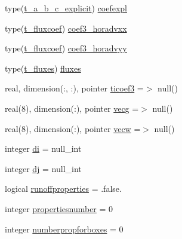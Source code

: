 \begin{DoxyCompactItemize}
\item 
type(\mbox{\hyperlink{structmodulerunoffproperties_1_1t__a__b__c__explicit}{t\+\_\+a\+\_\+b\+\_\+c\+\_\+explicit}}) \mbox{\hyperlink{structmodulerunoffproperties_1_1t__runoffproperties_a3c224ba894eb33b19bbb05306503ec32}{coefexpl}}
\item 
type(\mbox{\hyperlink{structmodulerunoffproperties_1_1t__fluxcoef}{t\+\_\+fluxcoef}}) \mbox{\hyperlink{structmodulerunoffproperties_1_1t__runoffproperties_a48f9a91c6641ea70995aaec98e2ce42c}{coef3\+\_\+horadvxx}}
\item 
type(\mbox{\hyperlink{structmodulerunoffproperties_1_1t__fluxcoef}{t\+\_\+fluxcoef}}) \mbox{\hyperlink{structmodulerunoffproperties_1_1t__runoffproperties_a50ad499fc46ad60706994b03a7500d22}{coef3\+\_\+horadvyy}}
\item 
type(\mbox{\hyperlink{structmodulerunoffproperties_1_1t__fluxes}{t\+\_\+fluxes}}) \mbox{\hyperlink{structmodulerunoffproperties_1_1t__runoffproperties_a754d61d82a166b5f4e644f4f478339c8}{fluxes}}
\item 
real, dimension(\+:, \+:), pointer \mbox{\hyperlink{structmodulerunoffproperties_1_1t__runoffproperties_a29f0a52ab34d40554e57dee86cb63c07}{ticoef3}} =$>$ null()
\item 
real(8), dimension(\+:), pointer \mbox{\hyperlink{structmodulerunoffproperties_1_1t__runoffproperties_a2c1e0ca617b1a97b8a3236c61d54f444}{vecg}} =$>$ null()
\item 
real(8), dimension(\+:), pointer \mbox{\hyperlink{structmodulerunoffproperties_1_1t__runoffproperties_ab05b314e40a708399c25fb22fe5a172c}{vecw}} =$>$ null()
\item 
integer \mbox{\hyperlink{structmodulerunoffproperties_1_1t__runoffproperties_a518005dc6a1b554fa5bc07a2357f7e37}{di}} = null\+\_\+int
\item 
integer \mbox{\hyperlink{structmodulerunoffproperties_1_1t__runoffproperties_a6da6a396ad30d54fefd4b5a17895512f}{dj}} = null\+\_\+int
\item 
logical \mbox{\hyperlink{structmodulerunoffproperties_1_1t__runoffproperties_a068930271192b266cb355cda5d4b0b93}{runoffproperties}} = .false.
\item 
integer \mbox{\hyperlink{structmodulerunoffproperties_1_1t__runoffproperties_a89e05f89ae724f5d6c2cc26df598daa0}{propertiesnumber}} = 0
\item 
integer \mbox{\hyperlink{structmodulerunoffproperties_1_1t__runoffproperties_a435b64cc4a4660bdf69bc10ee9c93939}{numberpropforboxes}} = 0
\item 

\end{DoxyCompactItemize}
